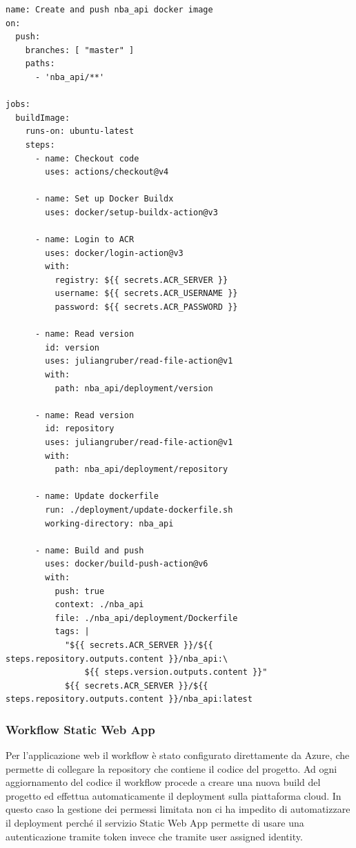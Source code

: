 \begin{verbatim}
name: Create and push nba_api docker image
on:
  push:
    branches: [ "master" ]
    paths:
      - 'nba_api/**'

jobs:
  buildImage:
    runs-on: ubuntu-latest
    steps:
      - name: Checkout code
        uses: actions/checkout@v4

      - name: Set up Docker Buildx
        uses: docker/setup-buildx-action@v3

      - name: Login to ACR
        uses: docker/login-action@v3
        with:
          registry: ${{ secrets.ACR_SERVER }}
          username: ${{ secrets.ACR_USERNAME }}
          password: ${{ secrets.ACR_PASSWORD }}

      - name: Read version
        id: version
        uses: juliangruber/read-file-action@v1
        with:
          path: nba_api/deployment/version

      - name: Read version
        id: repository
        uses: juliangruber/read-file-action@v1
        with:
          path: nba_api/deployment/repository

      - name: Update dockerfile
        run: ./deployment/update-dockerfile.sh
        working-directory: nba_api

      - name: Build and push
        uses: docker/build-push-action@v6
        with:
          push: true
          context: ./nba_api
          file: ./nba_api/deployment/Dockerfile
          tags: |
            "${{ secrets.ACR_SERVER }}/${{ steps.repository.outputs.content }}/nba_api:\
                ${{ steps.version.outputs.content }}"
            ${{ secrets.ACR_SERVER }}/${{ steps.repository.outputs.content }}/nba_api:latest
\end{verbatim}

\subsubsection{Workflow Static Web App}
Per l'applicazione web il workflow è stato configurato direttamente da Azure, che permette di collegare la repository che contiene il codice del progetto. Ad ogni aggiornamento del codice il workflow procede a creare una nuova build del progetto ed effettua automaticamente il deployment sulla piattaforma cloud. In questo caso la gestione dei permessi limitata non ci ha impedito di automatizzare il deployment perché il servizio Static Web App permette di usare una autenticazione tramite token invece che tramite user assigned identity.


